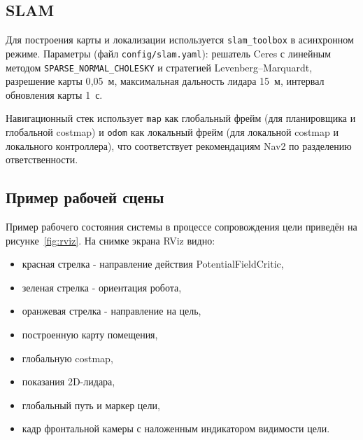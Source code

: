 \subsection{SLAM}

Для построения карты и локализации используется \texttt{slam\_toolbox}
в асинхронном режиме. Параметры (файл \texttt{config/slam.yaml}):
решатель Ceres с линейным методом
\texttt{SPARSE\_NORMAL\_CHOLESKY} и стратегией Levenberg--Marquardt,
разрешение карты 0{,}05~м, максимальная дальность лидара 15~м,
интервал обновления карты 1~с.

Навигационный стек использует \texttt{map} как глобальный фрейм (для
планировщика и глобальной costmap) и \texttt{odom} как локальный фрейм
(для локальной costmap и локального контроллера), что соответствует
рекомендациям Nav2 по разделению ответственности.

\subsection{Пример рабочей сцены}

Пример рабочего состояния системы в процессе сопровождения цели
приведён на рисунке~\ref{fig:rviz}. На снимке экрана RViz видно:
\begin{itemize}
      \item красная стрелка - направление действия PotentialFieldCritic,
      \item зеленая стрелка - ориентация робота,
      \item оранжевая стрелка - направление на цель,
      \item построенную карту помещения,
      \item глобальную costmap,
      \item показания 2D-лидара,
      \item глобальный путь и маркер цели,
      \item кадр фронтальной камеры с наложенным индикатором видимости цели.
\end{itemize}

